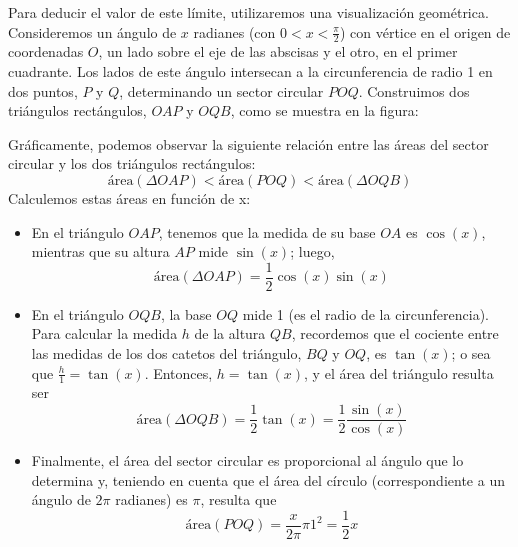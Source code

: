\documentclass[../teoria.root.tex]{subfiles}
\begin{document}
Para deducir el valor de este límite, utilizaremos una visualización geométrica.
Consideremos un ángulo de \(x\) radianes (con \(0<x<\frac{\pi}{2}\)) con vértice en el origen de coordenadas \(O\), un lado sobre el eje de las abscisas y el otro, en el primer cuadrante.
Los lados de este ángulo intersecan a la circunferencia de radio 1 en dos puntos, \(P\) y \(Q\), determinando un sector circular \(POQ\).
Construimos dos triángulos rectángulos, \(OAP\) y \(OQB\), como se muestra en la figura:
\begin{center}
    \begin{scaletikzpicturetowidth}{.5\linewidth}
    \end{scaletikzpicturetowidth}
\end{center}
Gráficamente, podemos observar la siguiente relación entre las áreas del sector circular y los dos triángulos rectángulos:
\[\text{área}(\Delta OAP)<\text{área}(POQ)<\text{área}(\Delta OQB)\]
Calculemos estas áreas en función de x:
\begin{itemize}
    \item En el triángulo \(OAP\), tenemos que la medida de su base \(OA\) es \(\cos(x)\), mientras que su altura \(AP\) mide \(\sin(x)\); luego,
          \[\text{área}(\Delta OAP)=\frac{1}{2}\cos(x)\sin(x)\]
    \item En el triángulo \(OQB\), la base \(OQ\) mide 1 (es el radio de la circunferencia).
          Para calcular la medida \(h\) de la altura \(QB\), recordemos que el cociente entre las medidas de los dos catetos del triángulo, \(BQ\) y \(OQ\), es \(\tan(x)\);
          o sea que \(\frac{h}{1}=\tan(x)\).
          Entonces, \(h=\tan(x)\), y el área del triángulo resulta ser
          \[\text{área}(\Delta OQB)=\frac{1}{2}\tan(x)=\frac{1}{2}\frac{\sin(x)}{\cos(x)}\]
    \item Finalmente, el área del sector circular es proporcional al ángulo que lo determina y, teniendo en cuenta que el área del círculo (correspondiente a un ángulo de \(2\pi\) radianes) es \(\pi\), resulta que
          \[\text{área}(POQ)=\frac{x}{2\pi}\pi 1^2=\frac{1}{2}x\]
\end{itemize}
\end{document}
